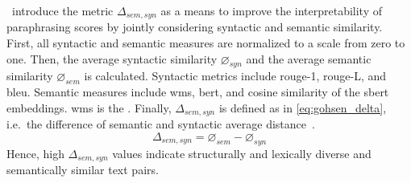 \citet{gohsen_captions_2023}\ introduce the metric $\Delta_{sem,syn}$ as a means to improve the interpretability of paraphrasing scores by jointly considering syntactic and semantic similarity.
First, all syntactic and semantic measures are normalized to a scale from zero to one.
Then, the average syntactic similarity $\diameter_{syn}$ and the average semantic similarity $\diameter_{sem}$ is calculated.
Syntactic metrics include \ac{rouge}-1, \ac{rouge}-L, and \ac{bleu}.
Semantic measures include \ac{wms}, \ac{bert}, and cosine similarity of the \ac{sbert} embeddings.
\ac{wms} is the .
Finally, $\Delta_{sem,syn}$ is defined as in \autoref{eq:gohsen_delta}, i.e.\ the difference of semantic and syntactic average distance~\citep{gohsen_captions_2023}.
\begin{equation}
    \Delta_{sem,syn}=\diameter_{sem}-\diameter_{syn}
    \label{eq:gohsen_delta}
\end{equation}
Hence, high $\Delta_{sem,syn}$ values indicate structurally and lexically diverse and semantically similar text pairs.
